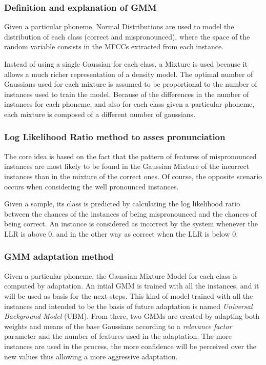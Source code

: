 \subsubsection{Definition and explanation of GMM}
	Given a particular phoneme, Normal Distributions are used to model the distribution of each class (correct 
	 and mispronounced), where the space of the random variable consists in the MFCCs extracted from each instance. 

	Instead of using a single Gaussian for each class, a Mixture is used because it allows
	a much richer representation of a density model. The optimal number of Gaussians used for each
	mixture is assumed to be proportional to the number of instances used to train the model.
	Because of the differences in the number of instances for each phoneme, and also for each 
	class given a particular phoneme, each mixture is composed of a different number of gaussians.

\subsubsection{Log Likelihood Ratio method to asses pronunciation}
	The core idea is based on the fact that the pattern of features of mispronounced instances are most likely to be found in the Gaussian Mixture of the incorrect instances than in the mixture of the
	correct ones. Of course, the opposite scenario occurs when considering the well pronounced
	instances.

	Given a sample, its class is predicted by calculating
	the log likelihood ratio between the chances of the instances of being mispronounced and
	the chances of being correct. An instance is considered as incorrect by the system whenever
	the LLR is above 0, and in the other way as correct when the LLR is below 0.

\subsubsection{GMM adaptation method}
	Given a particular phoneme, the Gaussian Mixture Model for each class is computed by adaptation.
	An intial GMM is trained with all the instances, and it will be used as basis for the next steps. This kind of model trained with all the instances and intended to be the basis of future
	adaptation is named \textit{Universal Background Model} (UBM).
	From there, two GMMs are created by adapting both weights and means of the base Gaussians according to a \textit{relevance factor} parameter and the number of features used in the adaptation. The more instances are used in the process, the more confidence will be perceived 
	over the new values thus allowing a more aggressive adaptation.

